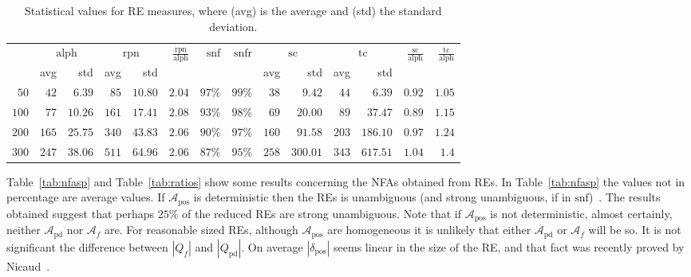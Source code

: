 \documentclass{llncs}
\newcommand{\nfas}{NFAs\xspace}
\newcommand{\re}{RE\xspace}
\newcommand{\res}{REs\xspace}
\newcommand{\snf}{\mbox{$\mathrm{snf}$}\xspace}
\newcommand{\snfr}{\mbox{$\mathrm{snfr}$}\xspace}
\newcommand{\alphw}{\mbox{$\mathrm{alph}$}\xspace}
\newcommand{\rpn}{\mbox{$\mathrm{rpn}$}\xspace}
\newcommand{\stc}{\mbox{$\mathrm{sc}$}\xspace}
\newcommand{\ttc}{\mbox{$\mathrm{tc}$}\xspace}
\newcommand{\nfa}{\mathcal{A}}
\newcommand{\pos}{{\mathrm{pos}}}
\newcommand{\pd}{{\mathrm{pd}}}
\begin{document}
\begin{table}
\vspace{-0.3cm}
  \caption{Statistical values for \re measures, where (avg) is the average and (std) the standard deviation.}
  \label{tab:resp}
  \centering
{\small
  \begin{tabular}{|r|||r|r||r|r||r||r|r||r|r||r|r||r|r|}\hline{}\multirow{2}{5mm}{size}&\multicolumn{2}{c||}{\alphw}&\multicolumn{2}{c||}{\rpn}&\multirow{2}{7mm}{$\frac{\rpn}{\alphw}$}&\multirow{2}{6mm}{\snf}&\multirow{2}{7mm}{\snfr}&\multicolumn{2}{c||}{\stc}&
  \multicolumn{2}{c||}{\ttc}&
  \multirow{2}{7mm}{$\frac{\stc}{\alphw}$}&\multirow{2}{7mm}{$\frac{\ttc}{\alphw}$}\\\cline{2-5}\cline{9-12}
  &avg&std&avg&std&&&&avg&std&avg&std&&\\\hline\hline
  $50$  &$42$  &$6.39$  &$85$   &$10.80$  &$2.04$  &$97\%$  &$99\%$&$38$&$9.42$&$44$&$6.39$&$0.92$&$1.05$\\
  $100$ &$77$  &$10.26$ &$161$  &$17.41$  &$2.08$  &$93\%$  &$98\%$&$69$&$20.00$&$89$&$37.47$&$0.89$&$1.15$\\
  $200$ &$165$ &$25.75$ &$340$  &$43.83$  &$2.06$  &$90\%$  &$97\%$&$160$&$91.58$&$203$&$186.10$&$0.97$&$1.24$\\
  $300$ &$247$ &$38.06$ &$511$  &$64.96$  &$2.06$  &$87\%$  &$95\%$&$258$&$300.01$&$343$&$617.51$&$1.04$&$1.4$\\
  \hline
\end{tabular}}
\vspace{-0.5cm}
\end{table}

Table~\ref{tab:nfasp} and Table~\ref{tab:ratios} show some results
concerning the \nfas obtained from \res.  In Table~\ref{tab:nfasp} the
values not in percentage are average values.  If $\nfa_\pos$ is
deterministic then the \res is unambiguous (and strong unambiguous, if
in \snf)~\cite{bruggemann-klein93:_regul_expres_into_finit_autom}. The
results obtained suggest that perhaps $25\%$ of the reduced \res are
strong unambiguous. Note that if $\nfa_\pos$ is not deterministic,
almost certainly, neither $\nfa_\pd$ nor $\nfa_f$ are. For reasonable
sized \res, although $\nfa_\pos$ are homogeneous it is unlikely that
either $\nfa_\pd$ or $\nfa_f$ will be so.  It is not significant the
difference between $|Q_f|$ and $|Q_\pd|$. On
average $|\delta_\pos|$ seems linear in the size of the \re, and that
fact was recently proved by
Nicaud~\cite{nicaud09:_averag_size_of_glush_autom_c}.
\end{document}
